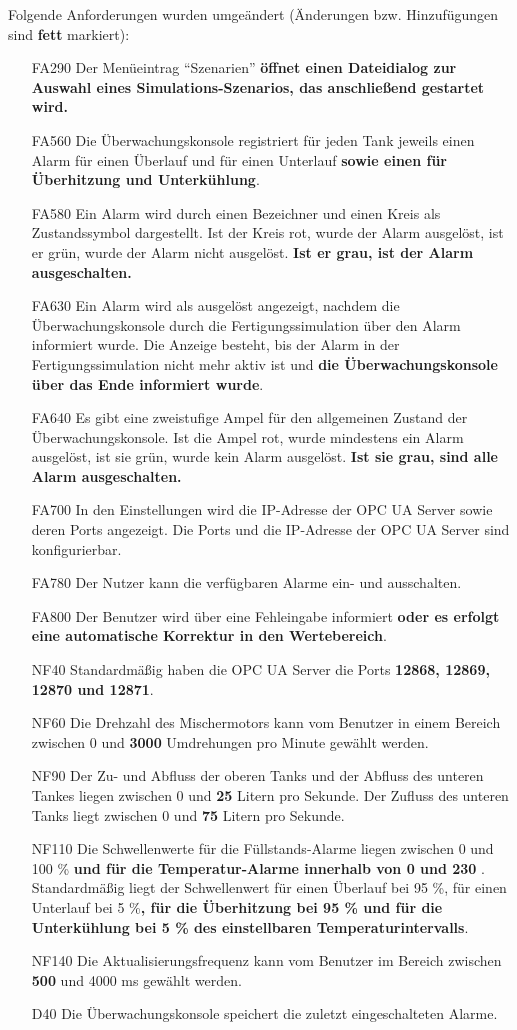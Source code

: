 \documentclass[parskip=full]{scrartcl}
\begin{document}
Folgende Anforderungen wurden umgeändert (Änderungen bzw. Hinzufügungen sind \textbf{fett} markiert):
\begin{enumerate}
 \item[FA290] Der Menüeintrag "`Szenarien"' \textbf{öffnet einen Dateidialog zur Auswahl eines Simulations-Szenarios, das anschließend gestartet wird.}
 \item[FA560] Die Überwachungskonsole registriert für jeden Tank jeweils einen Alarm für einen Überlauf und für einen Unterlauf \textbf{sowie einen für Überhitzung und Unterkühlung}.
 \item[FA580] Ein Alarm wird durch einen Bezeichner und einen Kreis als Zustandssymbol dargestellt. Ist der Kreis rot, wurde der Alarm ausgelöst, ist er grün, wurde der Alarm nicht ausgelöst. \textbf{Ist er grau, ist der Alarm ausgeschalten.}
 \item[FA630] Ein Alarm wird als ausgelöst angezeigt, nachdem die Überwachungskonsole durch die Fertigungssimulation über den Alarm informiert wurde. Die Anzeige besteht, bis der Alarm in der Fertigungssimulation nicht mehr aktiv ist und \textbf{die Überwachungskonsole über das Ende informiert wurde}.
 \item[FA640] Es gibt eine zweistufige Ampel für den allgemeinen Zustand der Überwachungskonsole. Ist die Ampel rot, wurde mindestens ein Alarm ausgelöst, ist sie grün, wurde kein Alarm ausgelöst. \textbf{Ist sie grau, sind alle Alarm ausgeschalten.}
 \item[FA700] In den Einstellungen wird die IP-Adresse der OPC UA Server sowie deren Ports angezeigt. Die Ports und die IP-Adresse der OPC UA Server sind konfigurierbar.
 \item[FA780] Der Nutzer kann die verfügbaren Alarme ein- und ausschalten.
 \item[FA800] Der Benutzer wird über eine Fehleingabe informiert \textbf{oder es erfolgt eine automatische Korrektur in den Wertebereich}.
 \item[NF40] Standardmäßig haben die OPC UA Server die Ports \textbf{12868, 12869, 12870 und 12871}.
 \item[NF60] Die Drehzahl des Mischermotors kann vom Benutzer in einem Bereich zwischen 0 und \textbf{3000} Umdrehungen pro Minute gewählt werden.
 \item[NF90] Der Zu- und Abfluss der oberen Tanks und der Abfluss des unteren Tankes liegen zwischen 0 und \textbf{25} Litern pro Sekunde. Der Zufluss des unteren Tanks liegt zwischen 0 und \textbf{75} Litern pro Sekunde.
 \item[NF110] Die Schwellenwerte für die Füllstands-Alarme liegen zwischen 0 und 100 \% \textbf{und für die Temperatur-Alarme innerhalb von 0 \textcelsius und 230 \textcelsius}. Standardmäßig liegt der Schwellenwert für einen Überlauf bei 95 \%, für einen Unterlauf bei 5 \%\textbf{, für die Überhitzung bei 95 \% und für die Unterkühlung bei 5 \% des einstellbaren Temperaturintervalls}.
 \item[NF140] Die Aktualisierungsfrequenz kann vom Benutzer im Bereich zwischen \textbf{500} und 4000 ms gewählt werden.
 \item[D40] Die Überwachungskonsole speichert die zuletzt eingeschalteten Alarme.
\end{enumerate}
\end{document}
